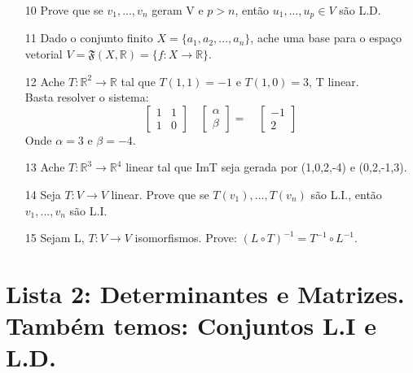 \documentclass[a4paper]{article}
\begin{document}
\begin{itemize}
\item[10] Prove que se $v_1,...,v_n$ geram V e $p>n$, então $u_1,...,u_p\in V$ são L.D.

\item[11] Dado o conjunto finito $X=\{a_1,a_2,...,a_n\}$, ache uma base para o espaço vetorial $V=\mathfrak{F}(X,\mathbb{R})=\{f:X\longrightarrow \mathbb{R}\}$.

\item[12] Ache $T:\mathbb{R}^2\longrightarrow \mathbb{R}$ tal que $T(1,1)=-1$ e $T(1,0)=3$, T linear.
\\
\textcolor[rgb]{0,0,1}{
Basta resolver o sistema:
$$
\left[\begin{array}{rr}
1&1\\
1&0
\end{array}\right]
\quad
\left[\begin{array}{c}
\alpha\\
\beta
\end{array}\right]
=
\quad
\left[\begin{array}{c}
-1\\
2
\end{array}\right]
$$
Onde $\alpha=3$  e $\beta=-4$.
}

\item[13] Ache $T:\mathbb{R}^3\longrightarrow \mathbb{R}^4$ linear tal que ImT seja gerada por (1,0,2,-4) e (0,2,-1,3).

\item[14] Seja $T:V\longrightarrow V$ linear. Prove que se $T(v_1),...,T(v_n)$ são L.I., então $v_1,...,v_n$ são L.I.

\item[15] Sejam L, $T:V\longrightarrow V$ isomorfismos. Prove: $(L\circ T)^{-1}=T^{-1}\circ L^{-1}$.
\end{itemize}

\section*{Lista 2: Determinantes e Matrizes. Também temos: Conjuntos L.I e L.D.}
\end{document}
